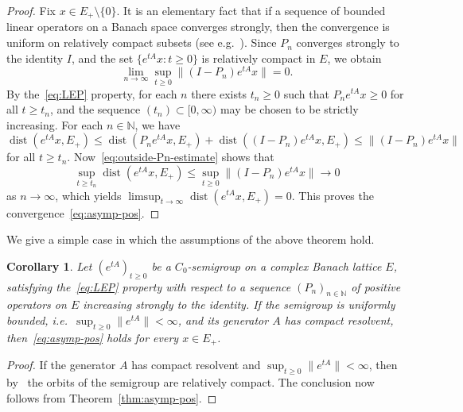 \documentclass[sn-mathphys]{sn-jnl}%
\theoremstyle{thmstyleone}
\newtheorem{corollary}[theorem]{Corollary}
\theoremstyle{thmstylethree}
\DeclareMathOperator{\dist}{dist}
\newcommand{\NN}{\mathbb{N}}
\begin{document}
\begin{proof}
	Fix $x\in E_+\setminus\{0\}$. It is an elementary fact that if a sequence of bounded linear operators on a Banach space converges strongly, then the convergence is uniform on relatively compact subsets (see e.g.~\cite[III Lemma 3.7]{Kato}). Since $P_n$ converges strongly to the identity $I$, and the set $\{e^{tA}x : t\ge 0\}$ is relatively compact in $E$, we obtain
	\begin{equation}
		\label{eq:outside-Pn-estimate}
		\lim_{n\to\infty}\sup_{t\ge 0}\|(I-P_n)e^{tA}x\| = 0.
	\end{equation}
	By the~\eqref{eq:LEP} property, for each $n$ there exists $t_n \ge 0$ such that $P_n e^{tA}x \ge 0$ for all $t\ge t_n$, and the sequence $(t_n) \subset [0,\infty)$ may be chosen to be strictly increasing. For each $n\in\NN$, we have
	\begin{equation*}
		\dist(e^{tA}x,E_+) \le \dist(P_n e^{tA}x,E_+) + \dist((I-P_n)e^{tA}x,E_+) \le \|(I-P_n)e^{tA}x\|
	\end{equation*}
	for all $t\ge t_n$. Now~\eqref{eq:outside-Pn-estimate} shows that
	\begin{equation*}
		\sup_{t\ge t_n} \dist(e^{tA}x,E_+) \le \sup_{t\ge 0}\|(I-P_n)e^{tA}x\| \longrightarrow 0
	\end{equation*}
	as $n\to\infty$, which yields $\limsup_{t\to\infty} \dist(e^{tA}x,E_+)=0$. This proves the convergence~\eqref{eq:asymp-pos}.
\end{proof}

We give a simple case in which the assumptions of the above theorem hold.
\begin{corollary}
	Let $(e^{tA})_{t\ge 0}$ be a $C_0$-semigroup on a complex Banach lattice $E$, satisfying the~\eqref{eq:LEP} property with respect to a sequence $(P_n)_{n\in\NN}$ of positive operators on $E$ increasing strongly to the identity. If the semigroup is uniformly bounded, i.e.\ $\sup_{t\ge 0}\|e^{tA}\|<\infty$, and its generator $A$ has compact resolvent, then~\eqref{eq:asymp-pos} holds for every $x\in E_+$.
\end{corollary}

\begin{proof}
	If the generator $A$ has compact resolvent and $\sup_{t\ge 0}\|e^{tA}\|<\infty$, then by~\cite[Corollary V.2.15(i)]{EN00} the orbits of the semigroup are relatively compact. The conclusion now follows from Theorem~\ref{thm:asymp-pos}.
\end{proof}
\end{document}
